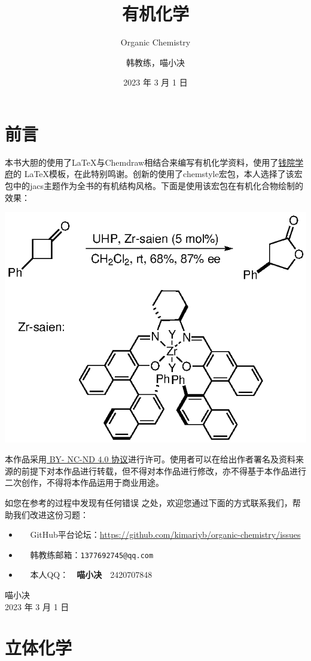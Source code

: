 \documentclass[
  10pt,
  twoside,
  openany,
  b5paper, %
  colorscheme = basic, %
]{qyxf-book}
\title{有机化学}
\subtitle{Organic Chemistry}  %
\author{韩教练，喵小决}
\date{2023 年 3 月 1 日}
\begin{document}
\maketitle

\chapter*{前言}

本书大胆的使用了\LaTeX 与Chemdraw相结合来编写有机化学资料，使用了\href{https://github.com/qyxf/qyxf-book}{钱院学府}的 \LaTeX 模板，在此特别鸣谢。创新的使用了chemstyle宏包，本人选择了该宏包中的jacs主题作为全书的有机结构风格。下面是使用该宏包在有机化合物绘制的效果：

\begin{scheme}[ht]
	\includegraphics{eg/eg.eps}
	
\end{scheme}

本作品采用\href{https://
	creativecommons.org/licenses/
	by-nc-nd/4.0/}{ BY-
	NC-ND 4.0 协议}进行许可。使用者可以在给出作者署名及资料来源的前提下对本作品进行转载，但不得对本作品进行修改，亦不得基于本作品进行二次创作，不得将本作品运用于商业用途。

如您在参考的过程中发现有任何错误
之处，欢迎您通过下面的方式联系我们，帮助我们改进这份习题：
\begin{itemize}
	\item \faGithub ~~ GitHub平台论坛：\url{https://github.com/kimariyb/organic-chemistry/issues}
	\item \faEnvelopeOpen ~~ 韩教练邮箱：\texttt{1377692745@qq.com}
	\item \faQq ~~ 
	本人QQ：~~\textbf{喵小决}~~2420707848
\end{itemize}

\begin{flushright}
	喵小决\\
	2023 年 3 月 1 日
\end{flushright}

\cleardoublepage

\tableofcontents

\chapter{立体化学}
\end{document}
